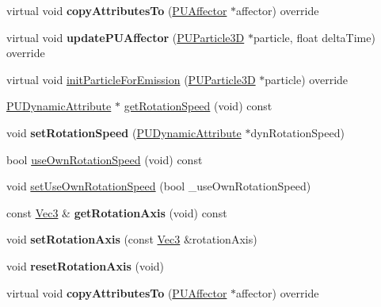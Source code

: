 \begin{DoxyCompactItemize}
virtual void {\bfseries copy\+Attributes\+To} (\hyperlink{classPUAffector}{P\+U\+Affector} $\ast$affector) override
\item 
\mbox{\label{classPUGeometryRotator_adda00ef8b5d246011b8f22727abbfb5f}} 
virtual void {\bfseries update\+P\+U\+Affector} (\hyperlink{structPUParticle3D}{P\+U\+Particle3D} $\ast$particle, float delta\+Time) override
\item 
virtual void \hyperlink{classPUGeometryRotator_a83d85244ee812af406d5cc81931dd5eb}{init\+Particle\+For\+Emission} (\hyperlink{structPUParticle3D}{P\+U\+Particle3D} $\ast$particle) override
\item 
\hyperlink{classPUDynamicAttribute}{P\+U\+Dynamic\+Attribute} $\ast$ \hyperlink{classPUGeometryRotator_a3e3851880f0707845466410294b4506e}{get\+Rotation\+Speed} (void) const
\item 
\mbox{\label{classPUGeometryRotator_aacd07e9741796821c11feb7ea06008c8}} 
void {\bfseries set\+Rotation\+Speed} (\hyperlink{classPUDynamicAttribute}{P\+U\+Dynamic\+Attribute} $\ast$dyn\+Rotation\+Speed)
\item 
bool \hyperlink{classPUGeometryRotator_a112e63c42288c669fd121000a75444ba}{use\+Own\+Rotation\+Speed} (void) const
\item 
void \hyperlink{classPUGeometryRotator_a7245251b9b42b431685bca5a6066caff}{set\+Use\+Own\+Rotation\+Speed} (bool \+\_\+use\+Own\+Rotation\+Speed)
\item 
\mbox{\label{classPUGeometryRotator_acae7a7f82f789579df329e5a0ac79b6e}} 
const \hyperlink{classVec3}{Vec3} \& {\bfseries get\+Rotation\+Axis} (void) const
\item 
\mbox{\label{classPUGeometryRotator_af367c6c9850c3330130004d0b14673fb}} 
void {\bfseries set\+Rotation\+Axis} (const \hyperlink{classVec3}{Vec3} \&rotation\+Axis)
\item 
\mbox{\label{classPUGeometryRotator_a19a38e4306b83849b144bd93270297c9}} 
void {\bfseries reset\+Rotation\+Axis} (void)
\item 
\mbox{\label{classPUGeometryRotator_a6ff543d67047eb3873dab94e2d24fc25}} 
virtual void {\bfseries copy\+Attributes\+To} (\hyperlink{classPUAffector}{P\+U\+Affector} $\ast$affector) override
\end{DoxyCompactItemize}
